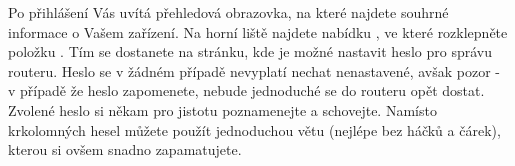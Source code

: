 Po přihlášení Vás uvítá přehledová obrazovka, na které najdete souhrné informace
o Vašem zařízení. Na horní liště najdete nabídku , ve které rozklepněte
položku . Tím se dostanete na stránku, kde je možné nastavit
heslo pro správu routeru. Heslo se v žádném případě nevyplatí nechat nenastavené,
avšak pozor - v případě že heslo zapomenete, nebude jednoduché se do routeru
opět dostat. Zvolené heslo si někam pro jistotu poznamenejte a schovejte.
Namísto krkolomných hesel můžete použít jednoduchou větu (nejlépe bez háčků
a čárek), kterou si ovšem snadno zapamatujete.




